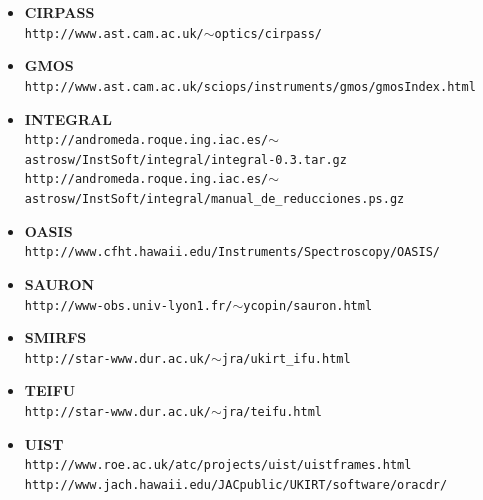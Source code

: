 \documentclass[twoside,11pt]{article}
\newcommand{\htmladdnormallink}[2]{#1}
\begin{document}
\begin{small}
\begin{itemize}

\item {\bf\label{sc16_available_cirpass}CIRPASS}\\
\htmladdnormallink{{\tt http://www.ast.cam.ac.uk/$\sim$optics/cirpass/}}{http://www.ast.cam.ac.uk/~optics/cirpass/}

\item {\bf\label{sc16_available_gmos}GMOS}\\
\htmladdnormallink{{\tt http://www.ast.cam.ac.uk/sciops/instruments/gmos/gmosIndex.html}}{http://www.ast.cam.ac.uk/sciops/instruments/gmos/gmosIndex.html}

\item {\bf\label{sc16_available_integral}INTEGRAL}\\
\htmladdnormallink{{\tt http://andromeda.roque.ing.iac.es/$\sim$astrosw/InstSoft/integral/integral-0.3.tar.gz}}{http://andromeda.roque.ing.iac.es/~astrosw/InstSoft/integral/integral-0.3.tar.gz}\\
\htmladdnormallink{{\tt http://andromeda.roque.ing.iac.es/$\sim$astrosw/InstSoft/integral/manual\_de\_reducciones.ps.gz}}{http://andromeda.roque.ing.iac.es/~astrosw/InstSoft/integral/manual_de_reducciones.ps.gz}

\item {\bf\label{sc16_available_oasis}OASIS}\\
\htmladdnormallink{{\tt http://www.cfht.hawaii.edu/Instruments/Spectroscopy/OASIS/}}{http://www.cfht.hawaii.edu/Instruments/Spectroscopy/OASIS/}

\item {\bf\label{sc16_available_sauron}SAURON}\\
\htmladdnormallink{{\tt http://www-obs.univ-lyon1.fr/$\sim$ycopin/sauron.html}}{http://www-obs.univ-lyon1.fr/~ycopin/sauron.html}

\item {\bf\label{sc16_available_smirfs}SMIRFS}\\
\htmladdnormallink{{\tt http://star-www.dur.ac.uk/$\sim$jra/ukirt\_ifu.html}}{http://star-www.dur.ac.uk/~jra/ukirt\_ifu.html}

\item {\bf\label{sc16_available_teifu}TEIFU}\\
\htmladdnormallink{{\tt http://star-www.dur.ac.uk/$\sim$jra/teifu.html}}{http://star-www.dur.ac.uk/~jra/teifu.html}

\item {\bf\label{sc16_available_uist}UIST}\\
\htmladdnormallink{{\tt http://www.roe.ac.uk/atc/projects/uist/uistframes.html}}{http://www.roe.ac.uk/atc/projects/uist/uistframes.html}\\
\htmladdnormallink{{\tt http://www.jach.hawaii.edu/JACpublic/UKIRT/software/oracdr/}}{http://www.jach.hawaii.edu/JACpublic/UKIRT/software/oracdr/}

\end{itemize}
\end{small}
\end{document}
